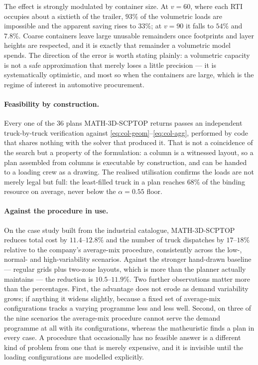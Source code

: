 The effect is strongly modulated by container size. At $v=60$, where
each RTI occupies about a sixtieth of the trailer, $93\%$ of the
volumetric loads are impossible and the apparent saving rises to
$33\%$; at $v=90$ it falls to $54\%$ and $7.8\%$. Coarse containers
leave large unusable remainders once footprints and layer heights are
respected, and it is exactly that remainder a volumetric model spends.
The direction of the error is worth stating plainly: a volumetric
capacity is not a safe approximation that merely loses a little
precision --- it is systematically optimistic, and most so when the
containers are large, which is the regime of interest in automotive
procurement.

\paragraph{Feasibility by construction.}
Every one of the 36 plans MATH-3D-SCPTOP returns passes an independent
truck-by-truck verification against
\eqref{eq:col-geom}--\eqref{eq:col-agg}, performed by code that shares
nothing with the solver that produced it. That is not a coincidence of
the search but a property of the formulation: a column is a witnessed
layout, so a plan assembled from columns is executable by
construction, and can be handed to a loading crew as a drawing. The
realised utilisation confirms the loads are not merely legal but full:
the least-filled truck in a plan reaches $68\%$ of the binding
resource on average, never below the $\alpha=0.55$ floor.

\paragraph{Against the procedure in use.}
On the case study built from the industrial catalogue,
MATH-3D-SCPTOP reduces total cost by $11.4$--$12.8\%$ and the number
of truck dispatches by $17$--$18\%$ relative to the company's
average-mix procedure, consistently across the low-, normal- and
high-variability scenarios. Against the stronger hand-drawn baseline
--- regular grids plus two-zone layouts, which is more than the
planner actually maintains --- the reduction is $10.5$--$11.9\%$.
Two further observations matter more than the percentages. First, the
advantage does not erode as demand variability grows; if anything it
widens slightly, because a fixed set of average-mix configurations
tracks a varying programme less and less well. Second, on three of the
nine scenarios the average-mix procedure cannot serve the demand
programme at all with its configurations, whereas the matheuristic
finds a plan in every case. A procedure that occasionally has no
feasible answer is a different kind of problem from one that is merely
expensive, and it is invisible until the loading configurations are
modelled explicitly.

